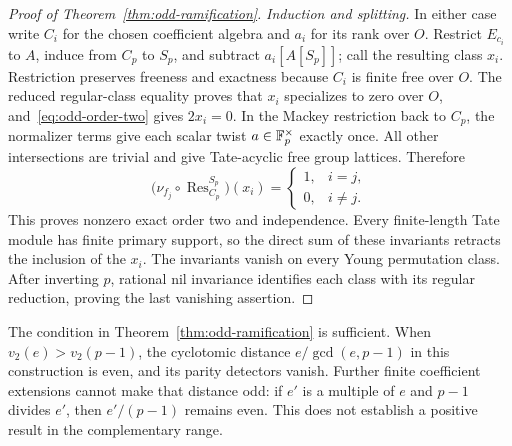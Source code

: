 \begin{proof}[Proof of Theorem~\ref{thm:odd-ramification}]
\emph{Induction and splitting.}
In either case write $C_i$ for the chosen coefficient algebra and
$a_i$ for its rank over $O$.
Restrict $E_{c_i}$ to $A$, induce from $C_p$ to $S_p$, and subtract
$a_i[A[S_p]]$; call the resulting class $x_i$.
Restriction preserves freeness and exactness because $C_i$ is finite
free over $O$.
The reduced regular-class equality proves that $x_i$ specializes to
zero over $O$, and~\eqref{eq:odd-order-two} gives $2x_i=0$.
In the Mackey restriction back to $C_p$, the normalizer terms give
each scalar twist $a\in\mathbb F_p^\times$ exactly once.
All other intersections are trivial and give Tate-acyclic free
group lattices.  Therefore
\[
 \bigl(\nu_{f_j}\circ\operatorname{Res}_{C_p}^{S_p}\bigr)(x_i)
 =\begin{cases}1,&i=j,\\0,&i\ne j.\end{cases}
\]
This proves nonzero exact order two and independence.
Every finite-length Tate module has finite primary support, so
the direct sum of these invariants retracts the inclusion of the
$x_i$.  The invariants vanish on every Young permutation class.
After inverting $p$, rational nil invariance identifies each class
with its regular reduction, proving the last vanishing assertion.
\end{proof}

\begin{remark}\label{rem:odd-ramification-scope}
The condition in Theorem~\ref{thm:odd-ramification} is sufficient.
When $v_2(e)>v_2(p-1)$, the cyclotomic distance $e/\gcd(e,p-1)$
in this construction is even, and its parity detectors vanish.
Further finite coefficient extensions cannot make that distance odd:
if $e'$ is a multiple of $e$ and $p-1$ divides $e'$, then
$e'/(p-1)$ remains even.
This does not establish a positive result in the complementary range.
\end{remark}
